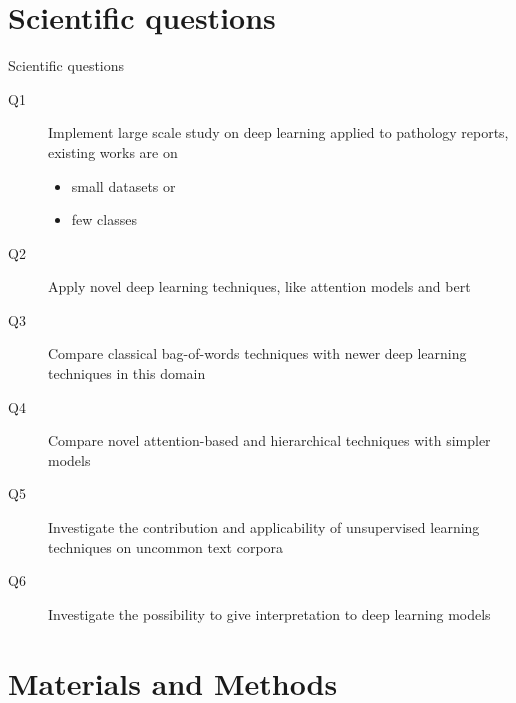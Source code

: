 \section{Scientific questions}

\begin{frame}{Scientific questions}
  \begin{description}
  \item[Q1] Implement \alert{large scale} study on deep learning
    applied to pathology reports, existing works are on
    \begin{itemize}
    \item \alert{small} datasets or
    \item \alert{few} classes
    \end{itemize}
  \item[Q2] Apply \alert{novel} deep learning techniques, like
    \alert{attention} models and \alert{\acs{bert}}
  \item[Q3] \alert{Compare} classical \alert{bag-of-words} techniques with
    newer deep learning techniques in this domain
  \item[Q4] \alert{Compare} novel \alert{attention}-based and
    \alert{hierarchical} techniques with simpler models
  \item[Q5] \alert{Investigate} the contribution and applicability of
    \alert{unsupervised} learning techniques on uncommon text corpora
  \item[Q6] \alert{Investigate} the possibility to give
    \alert{interpretation} to deep learning models
  \end{description}
\end{frame}


\section{Materials and Methods}

